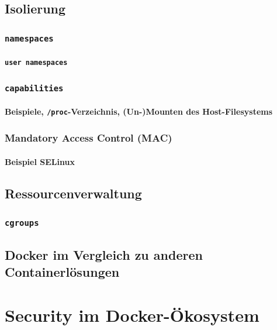 \documentclass[11pt,a4paper,oneside]{report}
\begin{document}
	\section{Isolierung}
		\subsection{\texttt{namespaces}}
			\subsubsection{\texttt{user namespaces}}
		\subsection{\texttt{capabilities}}
			\subsubsection{Beispiele, \texttt{/proc}-Verzeichnis, (Un-)Mounten des Host-Filesystems}
		\subsection{Mandatory Access Control (MAC)}
			\subsubsection{Beispiel SELinux}
	\section{Ressourcenverwaltung}
		\subsection{\texttt{cgroups}}
	\section{Docker im Vergleich zu anderen Containerlösungen}
\chapter{Security im Docker-Ökosystem}
\end{document}
